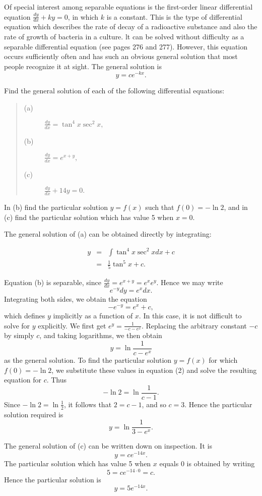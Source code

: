 Of special interest among separable equations is the first-order linear differential equation $\frac{dy}{dx} + ky = 0$, in which $k$ is a constant. This is the type of differential equation which describes the rate of decay of a radioactive substance and also the rate of growth of bacteria in a culture. lt can be solved without difficulty as a separable differential equation (see pages 276 and 277). However, this equation occurs sufficiently often and has such an obvious general solution that most people recognize it at sight. The general solution is
$$
y = ce^{-kx}.
$$

\begin{example} Find the general solution of each of the following differential equations:
 
\begin{quote}
\begin{description}
\item[(a)] $\frac{dy}{dx} = \tan^4 x \sec^2 x,$
\item[(b)] $\frac{dy}{dx} = e^{x+y},$ 
\item[(c)] $\frac{dy}{dx} + 14y = 0.$
\end{description}
\end{quote}

In (b) find the particular solution $y = f(x)$ such that $f(0) = -\ln2$, and in (c) find the particular solution which has value 5 when $x = 0$.

The general solution of (a) can be obtained directly by integrating: 

\begin{eqnarray*}
y &=& \int \tan^4 x \sec^2 x dx + c\\
   &=& \frac{1}{5} \tan^5 x + c.
\end{eqnarray*}

Equation (b) is separable, since $\frac{dy}{dx} = e^{x+y} = e^x e^y$. Hence we may write
$$
e^{-y} dy= e^x dx.
$$
Integrating both sides, we obtain the equation
$$
-e^{-y} = e^x + c, 
$$
which defines $y$ implicitly as a function of $x$. In this case, it is not difficult to solve for $y$ explicitly. We first get $e^y = \frac{1}{-c - e^x}$. Replacing the arbitrary constant $-c$ by simply $c$, and taking logarithms, we then obtain
\begin{equation}
y = \ln \frac{1}{c - e^x}   
\label{eq11.1.2}
\end{equation}
as the general solution. To find the particular solution $y = f(x)$ for which $f(0) = - \ln 2$, we substitute these values in equation (2) and solve the resulting equation for $c$. Thus
$$
- \ln 2 = \ln \frac{1}{c - 1} .
$$
Since $-\ln 2 = \ln \frac{1}{2}$, it follows that $2 = c - 1$, and so $c = 3$. Hence the particular solution required is
$$
y = \ln \frac{1}{3 - e^x} . 
$$

The general solution of (c) can be written down on inspection. It is 
$$
y = ce^{-14x} .
$$
The particular solution which has value 5 when $x$ equals 0 is obtained by writing
$$
5 = ce^{-14 \cdot 0} = c .
$$
Hence the particular solution is
$$
y= 5e^{-14x}.
$$
\end{example}

